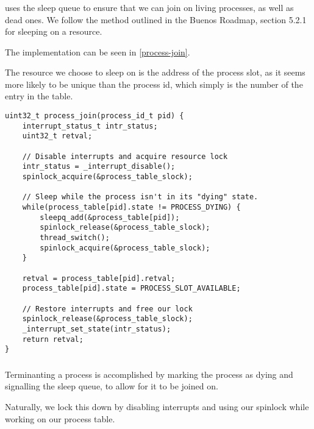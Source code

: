 \subsubsection{}
 uses the sleep queue to ensure that we can join on living
processes, as well as dead ones. We follow the method outlined in the Buenos
Roadmap, section 5.2.1 for sleeping on a resource.

The implementation can be seen in \autoref{process-join}.

The resource we choose to sleep on is the address of the process slot, as it
seems more likely to be unique than the process id, which simply is the number of
the entry in the table.

\begin{lstlisting}
uint32_t process_join(process_id_t pid) {
    interrupt_status_t intr_status;
    uint32_t retval;

    // Disable interrupts and acquire resource lock
    intr_status = _interrupt_disable();
    spinlock_acquire(&process_table_slock);

    // Sleep while the process isn't in its "dying" state.
    while(process_table[pid].state != PROCESS_DYING) {
        sleepq_add(&process_table[pid]);
        spinlock_release(&process_table_slock);
        thread_switch();
        spinlock_acquire(&process_table_slock);
    }

    retval = process_table[pid].retval;
    process_table[pid].state = PROCESS_SLOT_AVAILABLE;

    // Restore interrupts and free our lock
    spinlock_release(&process_table_slock);
    _interrupt_set_state(intr_status);
    return retval;
}
\end{lstlisting}

\subsubsection{}
Terminanting a process is accomplished by marking the process as dying and
signalling the sleep queue, to allow for it to be joined on.

Naturally, we lock this down by disabling interrupts and using our spinlock
while working on our process table.




